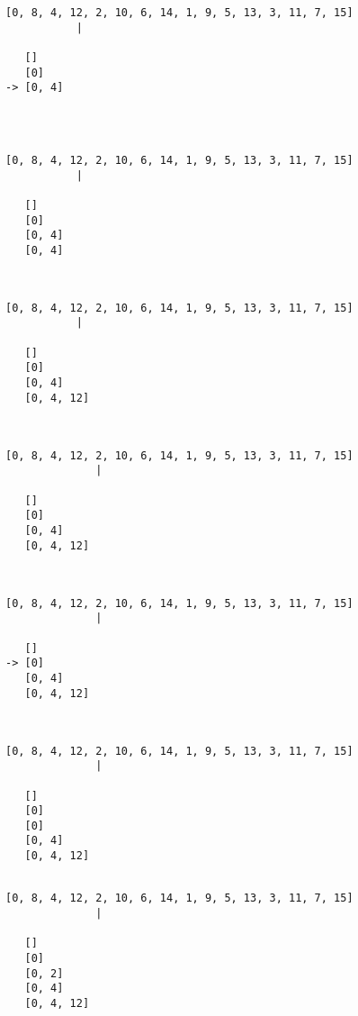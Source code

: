 { \begin{verbatim}
[0, 8, 4, 12, 2, 10, 6, 14, 1, 9, 5, 13, 3, 11, 7, 15]
           |

   []
   [0]
-> [0, 4]




\end{verbatim} }

{ \begin{verbatim}
[0, 8, 4, 12, 2, 10, 6, 14, 1, 9, 5, 13, 3, 11, 7, 15]
           |

   []
   [0]
   [0, 4]
   [0, 4]



\end{verbatim} }

{ \begin{verbatim}
[0, 8, 4, 12, 2, 10, 6, 14, 1, 9, 5, 13, 3, 11, 7, 15]
           |

   []
   [0]
   [0, 4]
   [0, 4, 12]



\end{verbatim} }

{ \begin{verbatim}
[0, 8, 4, 12, 2, 10, 6, 14, 1, 9, 5, 13, 3, 11, 7, 15]
              |

   []
   [0]
   [0, 4]
   [0, 4, 12]



\end{verbatim} }

{ \begin{verbatim}
[0, 8, 4, 12, 2, 10, 6, 14, 1, 9, 5, 13, 3, 11, 7, 15]
              |

   []
-> [0]
   [0, 4]
   [0, 4, 12]



\end{verbatim} }

{ \begin{verbatim}
[0, 8, 4, 12, 2, 10, 6, 14, 1, 9, 5, 13, 3, 11, 7, 15]
              |

   []
   [0]
   [0]
   [0, 4]
   [0, 4, 12]


\end{verbatim} }

{ \begin{verbatim}
[0, 8, 4, 12, 2, 10, 6, 14, 1, 9, 5, 13, 3, 11, 7, 15]
              |

   []
   [0]
   [0, 2]
   [0, 4]
   [0, 4, 12]


\end{verbatim} }

